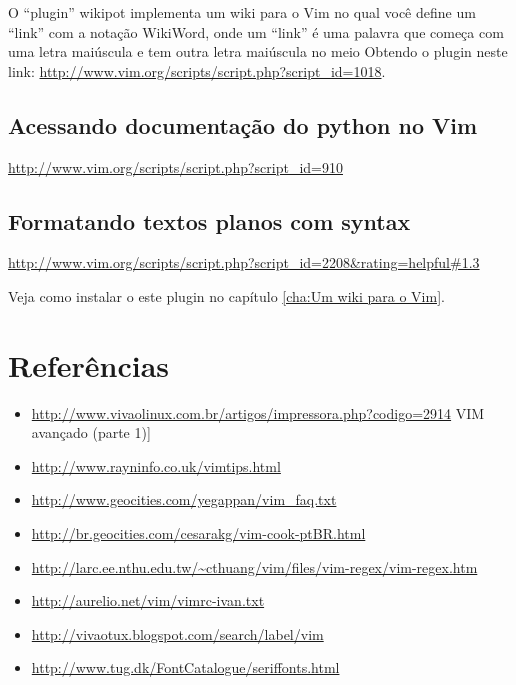 \documentclass[10pt,a4paper,openany]{book}
\begin{document}
O ``plugin'' wikipot implementa um wiki para o Vim no qual você define
um ``link'' com a notação WikiWord, onde um ``link'' é uma palavra que
começa com uma letra maiúscula e tem outra letra maiúscula no meio
Obtendo o plugin neste link: \url{http://www.vim.org/scripts/script.php?script\_id=1018}.

\section{Acessando documentação do python no Vim}\label{Acessando documentação do python no Vim}

 \url{http://www.vim.org/scripts/script.php?script\_id=910}

\section{Formatando textos planos com syntax}
\label{Formatando textos planos com syntax}
\url{http://www.vim.org/scripts/script.php?script\_id=2208&rating=helpful#1.3}

Veja como instalar o este plugin no capítulo \ref{cha:Um wiki para o Vim}.

\chapter{Referências}
\begin{itemize}
\item \url{http://www.vivaolinux.com.br/artigos/impressora.php?codigo=2914} VIM avançado (parte 1)]
\item \url{http://www.rayninfo.co.uk/vimtips.html}
\item \url{http://www.geocities.com/yegappan/vim\_faq.txt}
\item \url{http://br.geocities.com/cesarakg/vim-cook-ptBR.html}
\item \url{http://larc.ee.nthu.edu.tw/~cthuang/vim/files/vim-regex/vim-regex.htm}
\item \url{http://aurelio.net/vim/vimrc-ivan.txt}
\item \url{http://vivaotux.blogspot.com/search/label/vim}
\item \url{http://www.tug.dk/FontCatalogue/seriffonts.html}
\end{itemize}
\end{document}
